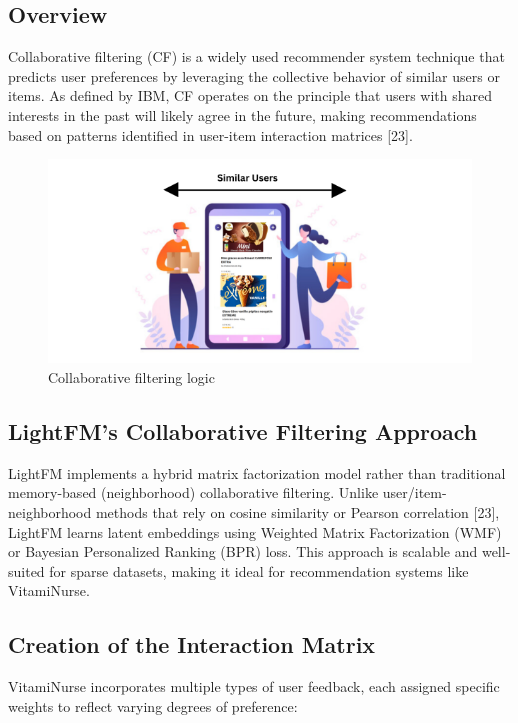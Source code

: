 \subsection{Overview}
Collaborative filtering (CF) is a widely used recommender system technique that predicts user preferences by leveraging the collective behavior
of similar users or items. As defined by IBM, CF operates on the principle
that users with shared interests in the past will likely agree in the future, making recommendations based on patterns identified in user-item
interaction matrices [23].

\begin{figure}[H]
\centering
\includegraphics[scale=0.85]{images/collaborative_filtering.png}
\caption{Collaborative filtering logic}
\label{fig:cf_workflow}
\end{figure}

\subsection{LightFM’s Collaborative Filtering Approach
}
LightFM implements a hybrid matrix factorization model rather than
traditional memory-based (neighborhood) collaborative filtering. Unlike
user/item-neighborhood methods that rely on cosine similarity or Pearson
correlation [23], LightFM learns latent embeddings using Weighted Matrix
Factorization (WMF) or Bayesian Personalized Ranking (BPR) loss. This
approach is scalable and well-suited for sparse datasets, making it ideal
for recommendation systems like VitamiNurse.

\subsection{ Creation of the Interaction Matrix}
VitamiNurse incorporates multiple types of user feedback, each assigned
specific weights to reflect varying degrees of preference:

